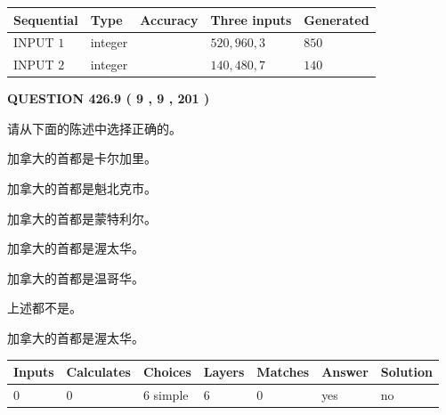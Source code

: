 \documentclass{ctexart}
\begin{document}
   
  
  
\noindent\begin{tabular}{|l|l|l|l|l|}
\hline
 Sequential & Type & Accuracy & Three inputs & Generated \\ 
\hline
 
 
  INPUT $  1 $ & integer &  & $
 520
 , 
 960
 , 
 3
 $ & $ 850 $ 
 \\  \hline  
 
 
  INPUT $  2 $ & integer &  & $
 140
 , 
 480
 , 
 7
 $ & $ 140 $ 
 \\  \hline  
 \end{tabular}
   
   
  
\vspace{0.2in}
  
{\textbf{\Large{QUESTION
426.9 
 ( 9 , 9 , 201 )
}}}
  
  
请从下面的陈述中选择正确的。
 
 
加拿大的首都是卡尔加里。
 
 
加拿大的首都是魁北克市。
 
 
加拿大的首都是蒙特利尔。
 
 
加拿大的首都是渥太华。
 
 
加拿大的首都是温哥华。
 
 
 上述都不是。
 
 
\noindent{}
 
 
加拿大的首都是渥太华。
 
 
\noindent{}
 
 
   
   
   
   
\noindent\begin{tabular}{|l|l|l|l|l|l|l|}
 \hline
Inputs & Calculates & Choices & Layers & Matches & Answer & Solution \\ \hline
 0  & 
 0  & 
 6
  simple  
  & 
 6  & 
 0  & 
  yes & 
  no 
  \\ \hline
 \end{tabular}
   
   
   
   
\noindent{}
   
\end{document}
